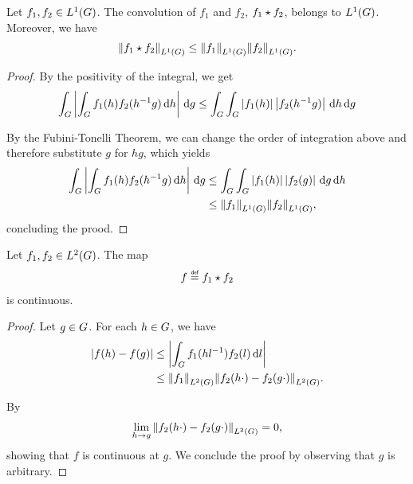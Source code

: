 \begin{proposition}
\label{proposition:integrability_of_the_convolution_of_two_L1_functions}
    Let $f_1, f_2 \in \Lebesgue 1 \Group$.
    The convolution of $f_1$ and $f_2$, $\conv {f_1} {f_2}$,
    belongs to $\Lebesgue 1 \Group$.
    Moreover, we have
    \begin{align*}
        \norm [\Lebesgue 1 \Group] {\conv {f_1} {f_2}}
        \leq
        \norm [\Lebesgue 1 \Group] {f_1}
        \norm [\Lebesgue 1 \Group] {f_2}.
    \end{align*}
\end{proposition}
\begin{proof}
    By the positivity of the integral,
    we get
    \begin{align*}
        \int_\Group \abs {\int_\Group f_1(h) f_2(h^{-1} g) \dd h} \dd g
        \leq \int_\Group \int_\Group \abs{f_1(h)} \abs{f_2(h^{-1} g)} \dd h \dd g
    \end{align*}

    By the Fubini-Tonelli Theorem,
    we can change the order of integration above
    and therefore substitute $g$ for $h g$,
    which yields
    \begin{align*}
        \int_\Group \abs {\int_\Group f_1(h) f_2(h^{-1} g) \dd h} \dd g
        &\leq \int_\Group \int_\Group \abs{f_1(h)} \abs{f_2(g)} \dd g \dd h\\
        &\leq \norm [\Lebesgue 1 \Group] {f_1} \norm [\Lebesgue 1 \Group] {f_2},
    \end{align*}
    concluding the prood.
\end{proof}

\begin{lemma}
    Let $f_1, f_2 \in \Lebesgue 2 \Group$.
    The map
    \begin{align*}
        f \defeq \conv {f_1} {f_2}
    \end{align*}
    is continuous.
\end{lemma}
\begin{proof}
    Let $g \in \Group$.
    For each $h \in \Group$,
    we have
    \begin{align*}
        \abs {f(h) - f(g)} &\leq \abs {\int_\Group f_1(h l^{-1}) f_2(l) \dd l}\\
        &\leq \norm [\Lebesgue 2 \Group] {f_1} \norm [\Lebesgue 2 \Group] {f_2(h \dummy) - f_2(g \dummy)}.
    \end{align*}

    By %
    \begin{align*}
        \lim_{h \to g} \norm [\Lebesgue 2 \Group] {f_2(h \dummy) - f_2(g \dummy)} = 0,
    \end{align*}
    showing that $f$ is continuous at $g$.
    We conclude the proof by observing that $g$ is arbitrary.
\end{proof}

